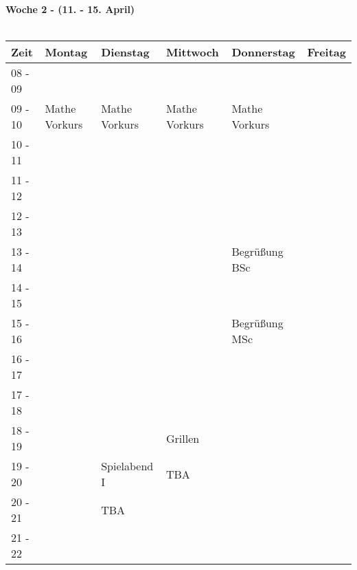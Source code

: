 \pagebreak
\textbf{Woche 2 - (11. - 15. April)}\\
\\
\begin{tabular}{|l|p{}|p{}|p{}|p{}|p{}|} \hline
\hline
Zeit    & Montag & Dienstag & Mittwoch & Donnerstag & Freitag \\ \hline
08 - 09 & & & & & \\ \cline{1-5} %
09 - 10 & \footnotesize{Mathe Vorkurs} & \footnotesize{Mathe Vorkurs} & \footnotesize{Mathe Vorkurs} & \footnotesize{Mathe Vorkurs} & \\ \cline{1-2}
10 - 11 & & & & & \\ \cline{1-1}
11 - 12 & & & & & \\ \cline{1-1} \cline{5-5}
12 - 13 & & & & & \\ \cline{1-1}
13 - 14 & & & & \cellcolor{lightgray} \footnotesize Begrüßung BSc & \\ \cline{1-1}
14 - 15 & & & & \cellcolor{lightgray} & \\ \cline{1-1} \cline{5-5}
15 - 16 & & & & \cellcolor{lightgray} \footnotesize Begrüßung MSc & \\ \cline{1-4}
16 - 17 & & & & \cellcolor{lightgray} & \\ \cline{1-1}
17 - 18 & & & & & \\ \cline{1-1} \cline{4-4}
18 - 19 & & & \cellcolor{lightlightgray} \footnotesize{Grillen} & & \\ \cline{1-1} \cline{3-3}
19 - 20 & & \cellcolor{lightlightgray} \footnotesize{Spielabend I} & \cellcolor{lightlightgray} \scriptsize{TBA} & & \\ \cline{1-1}
20 - 21 & & \cellcolor{lightlightgray} \scriptsize{TBA} & \cellcolor{lightlightgray} & & \\ \cline{1-1}
21 - 22 & & \cellcolor{lightlightgray} & \cellcolor{lightlightgray} & & \\ \hline
\end{tabular}


